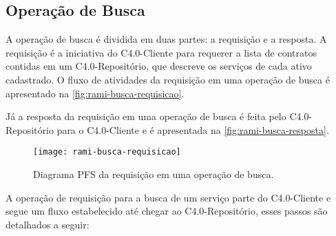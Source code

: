 \subsection{Operação de Busca}

	A operação de busca é dividida em duas partes: a requisição e a resposta. A requisição é a iniciativa do C4.0-Cliente para requerer a lista de contratos contidas em um C4.0-Repositório, que descreve os serviços de cada ativo cadastrado. O fluxo de atividades da requisição em uma operação de busca é apresentado na \autoref{fig:rami-busca-requisicao}.
	
	Já a resposta da requisição em uma operação de busca é feita pelo C4.0-Repositório para o C4.0-Cliente e é apresentada na \autoref{fig:rami-busca-resposta}.
	
	\begin{figure}[htb]
		\centering
		\label{fig:rami-busca-requisicao}
		\texttt{[image: rami-busca-requisicao]}
		\caption{Diagrama PFS da requisição em uma operação de busca.}
	\end{figure}

	A operação de requisição para a busca de um serviço parte do C4.0-Cliente e segue um fluxo estabelecido até chegar ao C4.0-Repositório, esses passos são detalhados a seguir:
	
